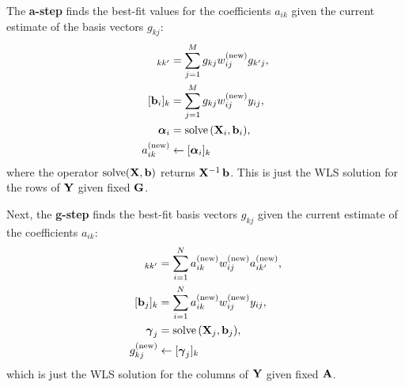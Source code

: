 \documentclass[onecolumn,floatfix,linenumbers,trackchanges]{aastex631}
\DeclareMathOperator{\solve}{solve}
\begin{document}
The \textbf{a-step} finds the best-fit values for the coefficients $a_{ik}$ given the current estimate of the basis vectors $g_{kj}$:
\begin{align}
    [{\bf X}_i]_{kk'} &= \sum_{j=1}^M g_{kj} w_{ij}^{\rm (new)} g_{k'j}, \\
    [{\bf b}_i]_k &= \sum_{j=1}^M g_{kj} w_{ij}^{\rm (new)} y_{ij}, \\
    \boldsymbol{\alpha}_i &= \solve{\left( {\bf X}_i, {\bf b}_i \right)}, \\
   a_{ik}^{\rm (new)} &\leftarrow [{\boldsymbol{\alpha}}_i]_k
\end{align}
where the operator $\solve({\bf X}, {\bf b})$ returns ${\bf X}^{-1}\,{\bf b}$.
This is just the WLS solution for the rows of ${\bf Y}$ given fixed ${\bf G}$.

Next, the \textbf{g-step} finds the best-fit basis vectors $g_{kj}$ given the current estimate of the coefficients $a_{ik}$:
\begin{align}
    [{\bf X}_j]_{kk'} &= \sum_{i=1}^N a^{\rm (new)}_{ik} w_{ij}^{\rm (new)} a^{\rm (new)}_{ik'}, \\
    [{\bf b}_j]_k &= \sum_{i=1}^N a^{\rm (new)}_{ik} w_{ij}^{\rm (new)} y_{ij}, \\
    \boldsymbol{\gamma}_j &= \solve{\left( {\bf X}_j, {\bf b}_j \right)}, \\
   g_{kj}^{\rm (new)} &\leftarrow [\boldsymbol{\gamma}_j]_k
\end{align}
which is just the WLS solution for the columns of ${\bf Y}$ given fixed ${\bf A}$.
\end{document}
